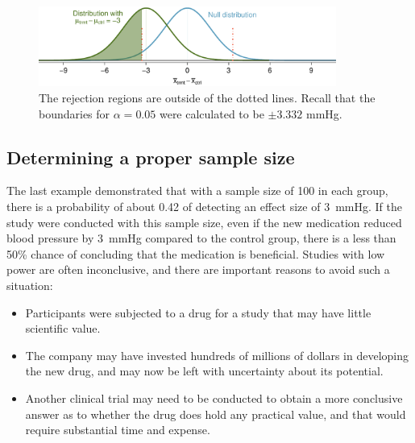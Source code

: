 \begin{figure}[h]
\begin{center}
	\includegraphics[width=0.87\textwidth]{ch_inference_for_means_oi_biostat/figures/power_null_0_1-7/power_null_D_0_1-7_with_alt_at_3_and_shaded}
	\caption{The rejection regions are outside of the dotted lines. Recall that the boundaries for $\alpha = 0.05$ were calculated to be $\pm 3.332$ mmHg.}
	\label{power_null_D_0_1-7_with_alt_at_3_and_shaded}
\end{center}	
\end{figure}


\textD{\newpage}


\subsection{Determining a proper sample size}

The last example demonstrated that with a sample size of 100 in each group, there is a probability of about 0.42 of detecting an effect size of 3~mmHg. If the study were conducted with this sample size, even if the new medication reduced blood pressure by 3~mmHg compared to the control group, there is a less than 50\% chance of concluding that the medication is beneficial. Studies with low power are often inconclusive, and there are important reasons to avoid such a situation:

\begin{itemize}
	\setlength{\itemsep}{0mm}
	\item Participants were subjected to a drug for a study that may have little scientific value. 
	
	\item The company may have invested hundreds of millions of dollars in developing the new drug, and may now be left with uncertainty about its potential. 
	
	\item Another clinical trial may need to be conducted to obtain a more conclusive answer as to whether the drug does hold any practical value, and that would require substantial time and expense. 
\end{itemize}

